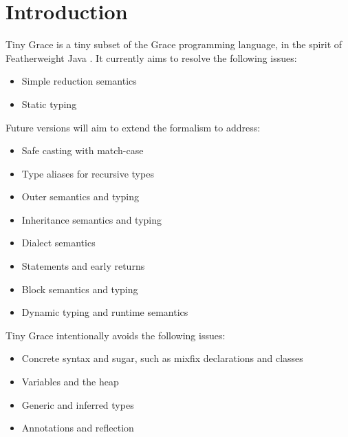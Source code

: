 \section{Introduction}\label{sec:introduction}

Tiny Grace is a tiny subset of the Grace programming language, in the spirit of
Featherweight Java \cite{fj}. It currently aims to resolve the following issues:

\begin{itemize}

\item Simple reduction semantics

\item Static typing

\end{itemize}

\noindent Future versions will aim to extend the formalism to address:

\begin{itemize}

\item Safe casting with match-case

\item Type aliases for recursive types

\item Outer semantics and typing

\item Inheritance semantics and typing

\item Dialect semantics

\item Statements and early returns

\item Block semantics and typing

\item Dynamic typing and runtime semantics

\end{itemize}

\noindent Tiny Grace intentionally avoids the following issues:

\begin{itemize}

\item Concrete syntax and sugar, such as mixfix declarations and classes

\item Variables and the heap

\item Generic and inferred types

\item Annotations and reflection

\end{itemize}

